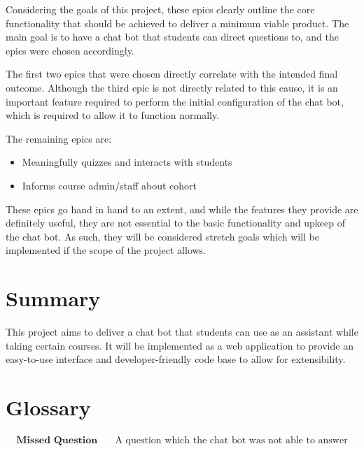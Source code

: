 \documentclass{article}
\begin{document}
Considering the goals of this project, these epics clearly outline the core functionality that should be achieved to deliver a minimum viable product. The main goal is to have a chat bot that students can direct questions to, and the epics were chosen accordingly.

The first two epics that were chosen directly correlate with the intended final outcome. Although the third epic is not directly related to this cause, it is an important feature required to perform the initial configuration of the chat bot, which is required to allow it to function normally.

The remaining epics are:
\begin{itemize}
  \item Meaningfully quizzes and interacts with students
  \item Informs course admin/staff about cohort
\end{itemize}

These epics go hand in hand to an extent, and while the features they provide are definitely useful, they are not essential to the basic functionality and upkeep of the chat bot. As such, they will be considered stretch goals which will be implemented if the scope of the project allows.


\section{Summary}

This project aims to deliver a chat bot that students can use as an assistant while taking certain courses. It will be implemented as a web application to provide an easy-to-use interface and developer-friendly code base to allow for extensibility. 

\section{Glossary} %

\begin{align*}
  \textbf{Missed Question}    \quad   &\text{A question which the chat bot was not able to answer}
\end{align*}
\end{document}
